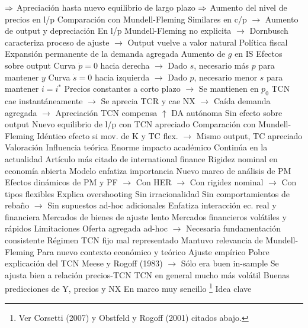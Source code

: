 \documentclass{nuevotema}
\begin{document}
\begin{esquemal}
				\4[] $\then$ Apreciación hasta nuevo equilibrio de largo plazo
				\4[] $\then$ Aumento del nivel de precios en l/p
				\4 Comparación con Mundell-Fleming
				\4[] Similares en c/p
				\4[] $\to$ Aumento de output y depreciación
				\4[] En l/p Mundell-Fleming no explicita
				\4[] $\to$ Dornbusch caracteriza proceso de ajuste
				\4[] $\to$ Output vuelve a valor natural
			\3 Política fiscal
				\4 Expansión permanente de la demanda agregada
				\4[] Aumento de $g$ en IS
				\4 
				\4 Efectos sobre output
				\4[] Curva $\dot{p} = 0$ hacia derecha
				\4[] $\to$ Dado $s$, necesario más $p$ para mantener $y$
				\4[] Curva $\dot{s} = 0$ hacia izquierda
				\4[] $\to$ Dado $p$, necesario menor $s$ para mantener $i=i^*$
				\4[] Precios constantes a corto plazo
				\4[] $\to$ Se mantienen en $p_0$
				\4[] TCN cae instantáneamente
				\4[] $\to$ Se aprecia TCR y cae NX
				\4[] $\to$ Caída demanda agregada
				\4[] $\to$ Apreciación TCN compensa $\uparrow$ DA autónoma
				\4[$\then$] Sin efecto sobre output
				\4[$\then$] Nuevo equilibrio de l/p con TCN apreciado
				\4 Comparación con Mundell-Fleming
				\4[] Idéntico efecto si mov. de K y TC flex.
				\4[] $\to$ Mismo output, TC apreciado
		\2 Valoración
			\3 Influencia teórica
				\4 Enorme impacto académico
				\4[] Continúa en la actualidad
				\4[] Artículo más citado de international finance
				\4 Rigidez nominal en economía abierta
				\4[] Modelo enfatiza importancia
				\4 Nuevo marco de análisis de PM
				\4[] Efectos dinámicos de PM y PF
				\4[] $\to$ Con HER
				\4[] $\to$ Con rigidez nominal
				\4[] $\to$ Con tipos flexibles
				\4 Explica overshooting
				\4[] Sin irracionalidad
				\4[] Sin comportamientos de rebaño
				\4[] $\to$ Sin supuestos ad-hoc adicionales
				\4 Enfatiza interacción ec. real y financiera
				\4[] Mercados de bienes de ajuste lento
				\4[] Mercados financieros volátiles y rápidos
				\4 Limitaciones
				\4[] Oferta agregada ad-hoc
				\4[] $\to$ Necesaria fundamentación consistente
				\4[] Régimen TCN fijo mal representado
				\4 Mantuvo relevancia de Mundell-Fleming
				\4[] Para nuevo contexto económico y teórico
			\3 Ajuste empírico
				\4 Pobre explicación del TCN
				\4[] Meese y Rogoff (1983)
				\4[] $\to$ Sólo era buen in-sample
				\4 Se ajusta bien a relación precios-TCN
				\4[] TCN en general mucho más volátil
				\4 Buenas predicciones de Y, precios y NX
				\4[] En marco muy sencillo
	\1 \footnote{Ver Corsetti (2007) y Obstfeld y Rogoff (2001) citados abajo.}
		\2 Idea clave

\end{esquemal}
\end{document}
